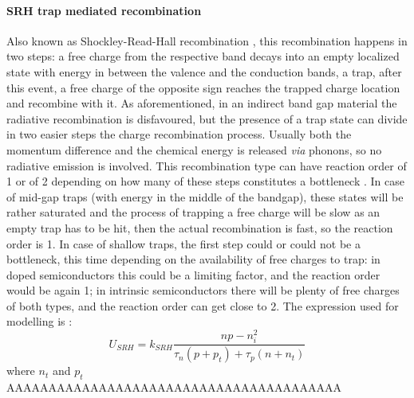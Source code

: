 		\paragraph{SRH trap mediated recombination}
		Also known as Shockley-Read-Hall recombination \cite{Shockley1952}, this recombination happens in two steps: a free charge from the respective band decays into an empty localized state with energy in between the valence and the conduction bands, a trap, after this event, a free charge of the opposite sign reaches the trapped charge location and recombine with it.
		As aforementioned, in an indirect band gap material the radiative recombination is disfavoured, but the presence of a trap state can divide in two easier steps the charge recombination process.
		Usually both the momentum difference and the chemical energy is released \textit{via} phonons, so no radiative emission is involved.
		This recombination type can have reaction order of 1 or of 2 depending on how many of these steps constitutes a bottleneck \cite{Calado2018b}.
		In case of mid-gap traps (with energy in the middle of the bandgap), these states will be rather saturated and the process of trapping a free charge will be slow as an empty trap has to be hit, then the actual recombination is fast, so the reaction order is 1.
		In case of shallow traps, the first step could or could not be a bottleneck, this time depending on the availability of free charges to trap: in doped semiconductors this could be a limiting factor, and the reaction order would be again 1; in intrinsic semiconductors there will be plenty of free charges of both types, and the reaction order can get close to 2.
		The expression used for modelling is \cite{Shockley1952}:
		\begin{equation}\label{eq:srh}
		U_{SRH} = k_{SRH} \frac{np-n_i^2}{\tau_n(p+p_t)+ \tau_p(n+n_t)}
		\end{equation}
		where $n_t$ and $p_t$ AAAAAAAAAAAAAAAAAAAAAAAAAAAAAAAAAAAAAAAA

